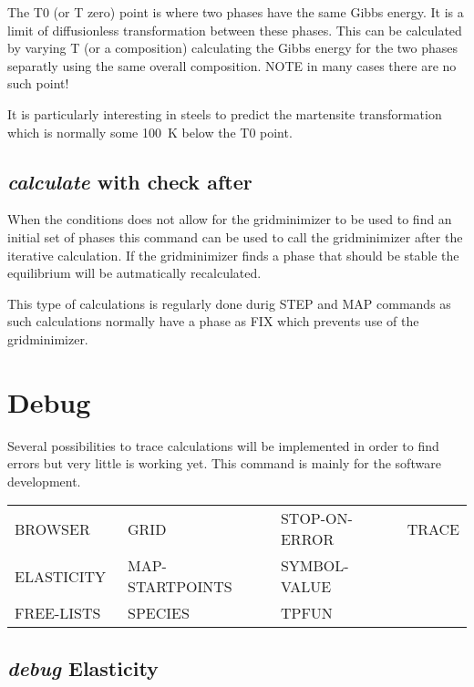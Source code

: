 \documentclass[11pt]{article}
\begin{document}
The T0 (or T zero) point is where two phases have the same Gibbs
energy.  It is a limit of diffusionless transformation between these
phases.  This can be calculated by varying T (or a composition)
calculating the Gibbs energy for the two phases separatly using the
same overall composition.  NOTE in many cases there are no such point!

It is particularly interesting in steels to predict the martensite
transformation which is normally some 100~K below the T0 point.

\hypertarget{Calculate with check}{}
\subsection{{\em calculate} with check after}

When the conditions does not allow for the gridminimizer to be used to
find an initial set of phases this command can be used to call the
gridminimizer after the iterative calculation.  If the gridminimizer
finds a phase that should be stable the equilibrium will be
autmatically recalculated.

This type of calculations is regularly done durig STEP and MAP
commands as such calculations normally have a phase as FIX which
prevents use of the gridminimizer.

\hypertarget{Debug}{}
\section{Debug }

Several possibilities to trace calculations will be implemented in
order to find errors but very little is working yet.  This command is
mainly for the software development.

{\small
\begin{tabular}{llll}
BROWSER     & GRID             & STOP-ON-ERROR~ & TRACE   \\
ELASTICITY~ & MAP-STARTPOINTS~ & SYMBOL-VALUE \\
FREE-LISTS  & SPECIES          & TPFUN~        \\
\end{tabular}
}

\hypertarget{Debug elasticity}{}
\subsection{{\em debug} Elasticity}
\end{document}
